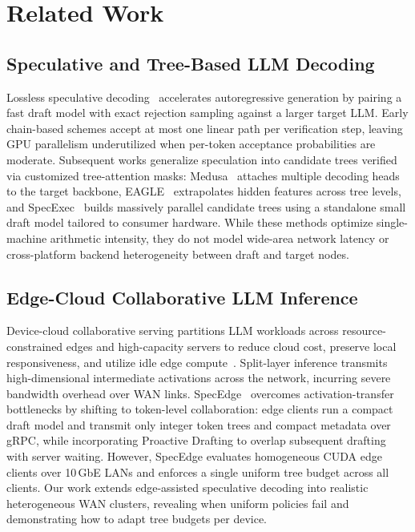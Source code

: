 \documentclass[10pt,conference]{IEEEtran}
\begin{document}
\section{Related Work}

\subsection{Speculative and Tree-Based LLM Decoding}

Lossless speculative decoding~\cite{leviathan2023spec,chen2023accelerating} accelerates autoregressive generation by pairing a fast draft model with exact rejection sampling against a larger target LLM. Early chain-based schemes accept at most one linear path per verification step, leaving GPU parallelism underutilized when per-token acceptance probabilities are moderate. Subsequent works generalize speculation into candidate trees verified via customized tree-attention masks: Medusa~\cite{cai2024medusa} attaches multiple decoding heads to the target backbone, EAGLE~\cite{li2024eagle} extrapolates hidden features across tree levels, and SpecExec~\cite{svirschevski2024specexec} builds massively parallel candidate trees using a standalone small draft model tailored to consumer hardware. While these methods optimize single-machine arithmetic intensity, they do not model wide-area network latency or cross-platform backend heterogeneity between draft and target nodes.

\subsection{Edge-Cloud Collaborative LLM Inference}

Device-cloud collaborative serving partitions LLM workloads across resource-constrained edges and high-capacity servers to reduce cloud cost, preserve local responsiveness, and utilize idle edge compute~\cite{kang2017neurosurgeon,hao2024hybrid}. Split-layer inference transmits high-dimensional intermediate activations across the network, incurring severe bandwidth overhead over WAN links. SpecEdge~\cite{park2025specedge} overcomes activation-transfer bottlenecks by shifting to token-level collaboration: edge clients run a compact draft model and transmit only integer token trees and compact metadata over gRPC, while incorporating Proactive Drafting to overlap subsequent drafting with server waiting. However, SpecEdge evaluates homogeneous CUDA edge clients over 10\,GbE LANs and enforces a single uniform tree budget across all clients. Our work extends edge-assisted speculative decoding into realistic heterogeneous WAN clusters, revealing when uniform policies fail and demonstrating how to adapt tree budgets per device.
\end{document}
